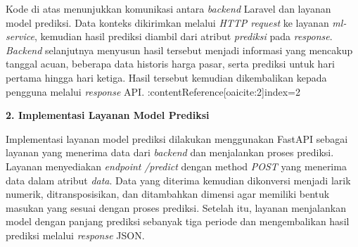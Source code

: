 \begin{code}
\end{code}

Kode di atas menunjukkan komunikasi antara \textit{backend} Laravel dan layanan model prediksi. Data konteks dikirimkan melalui \textit{HTTP request} ke layanan \textit{ml-service}, kemudian hasil prediksi diambil dari atribut \textit{prediksi} pada \textit{response}. \textit{Backend} selanjutnya menyusun hasil tersebut menjadi informasi yang mencakup tanggal acuan, beberapa data historis harga pasar, serta prediksi untuk hari pertama hingga hari ketiga. Hasil tersebut kemudian dikembalikan kepada pengguna melalui \textit{response} API. :contentReference[oaicite:2]{index=2}

\vspace{0.5em}
\noindent\textbf{2. Implementasi Layanan Model Prediksi}
\vspace{0.5em}

Implementasi layanan model prediksi dilakukan menggunakan FastAPI sebagai layanan yang menerima data dari \textit{backend} dan menjalankan proses prediksi. Layanan menyediakan \textit{endpoint} \textit{/predict} dengan method \textit{POST} yang menerima data dalam atribut \textit{data}. Data yang diterima kemudian dikonversi menjadi larik numerik, ditransposisikan, dan ditambahkan dimensi agar memiliki bentuk masukan yang sesuai dengan proses prediksi. Setelah itu, layanan menjalankan model dengan panjang prediksi sebanyak tiga periode dan mengembalikan hasil prediksi melalui \textit{response} JSON.

